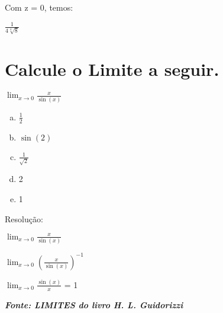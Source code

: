 \documentclass{article}
\begin{document}
\begin{description}
    \item[Com z = 0, temos:]
\end{description}

\Huge $\frac {1}{4 \sqrt[4]{8}}$

\pagebreak

\section{Calcule o Limite a seguir.}
{\LARGE $ \lim_{x\to 0} {\frac {x}{\sin (x)}} $}

\begin{enumerate}[(a)]
     \Large \item $\frac {1}{2}$
     \item $\sin (2) $
     \item $\frac {1}{\sqrt{2}}$
     \item 2
     \item 1
\end{enumerate}

\begin{description}
    \item[Resolução:]
\end{description}

{\LARGE $ \lim_{x\to 0} {\frac {x}{\sin (x)}} $}

{\LARGE $ \lim_{x\to 0} {(\frac {x}{\sin (x)})^{-1}} $}

{\LARGE $ \lim_{x\to 0} {\frac {\sin (x)}{x}} $} = 1 \vspace{2cm}

\small\textbf{\textit{Fonte: LIMITES do livro H. L. Guidorizzi}}
\end{document}
